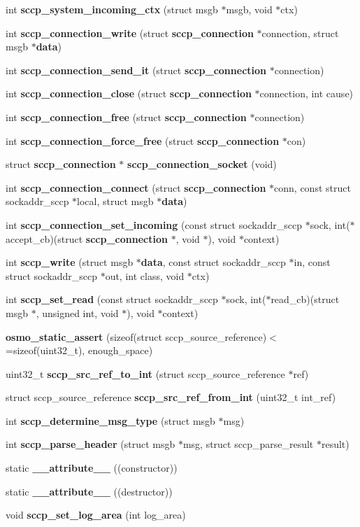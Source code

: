 \begin{DoxyCompactItemize}
int {\bf sccp\+\_\+system\+\_\+incoming\+\_\+ctx} (struct msgb $\ast$msgb, void $\ast$ctx)
\item 
int {\bf sccp\+\_\+connection\+\_\+write} (struct {\bf sccp\+\_\+connection} $\ast$connection, struct msgb $\ast${\bf data})
\item 
int {\bf sccp\+\_\+connection\+\_\+send\+\_\+it} (struct {\bf sccp\+\_\+connection} $\ast$connection)
\item 
int {\bf sccp\+\_\+connection\+\_\+close} (struct {\bf sccp\+\_\+connection} $\ast$connection, int cause)
\item 
int {\bf sccp\+\_\+connection\+\_\+free} (struct {\bf sccp\+\_\+connection} $\ast$connection)
\item 
int {\bf sccp\+\_\+connection\+\_\+force\+\_\+free} (struct {\bf sccp\+\_\+connection} $\ast$con)
\item 
struct {\bf sccp\+\_\+connection} $\ast$ {\bf sccp\+\_\+connection\+\_\+socket} (void)
\item 
int {\bf sccp\+\_\+connection\+\_\+connect} (struct {\bf sccp\+\_\+connection} $\ast$conn, const struct sockaddr\+\_\+sccp $\ast$local, struct msgb $\ast${\bf data})
\item 
int {\bf sccp\+\_\+connection\+\_\+set\+\_\+incoming} (const struct sockaddr\+\_\+sccp $\ast$sock, int($\ast$accept\+\_\+cb)(struct {\bf sccp\+\_\+connection} $\ast$, void $\ast$), void $\ast$context)
\item 
int {\bf sccp\+\_\+write} (struct msgb $\ast${\bf data}, const struct sockaddr\+\_\+sccp $\ast$in, const struct sockaddr\+\_\+sccp $\ast$out, int class, void $\ast$ctx)
\item 
int {\bf sccp\+\_\+set\+\_\+read} (const struct sockaddr\+\_\+sccp $\ast$sock, int($\ast$read\+\_\+cb)(struct msgb $\ast$, unsigned int, void $\ast$), void $\ast$context)
\item 
{\bf osmo\+\_\+static\+\_\+assert} (sizeof(struct sccp\+\_\+source\+\_\+reference)$<$=sizeof(uint32\+\_\+t), enough\+\_\+space)
\item 
uint32\+\_\+t {\bf sccp\+\_\+src\+\_\+ref\+\_\+to\+\_\+int} (struct sccp\+\_\+source\+\_\+reference $\ast$ref)
\item 
struct sccp\+\_\+source\+\_\+reference {\bf sccp\+\_\+src\+\_\+ref\+\_\+from\+\_\+int} (uint32\+\_\+t int\+\_\+ref)
\item 
int {\bf sccp\+\_\+determine\+\_\+msg\+\_\+type} (struct msgb $\ast$msg)
\item 
int {\bf sccp\+\_\+parse\+\_\+header} (struct msgb $\ast$msg, struct sccp\+\_\+parse\+\_\+result $\ast$result)
\item 
static {\bf \+\_\+\+\_\+attribute\+\_\+\+\_\+} ((constructor))
\item 
static {\bf \+\_\+\+\_\+attribute\+\_\+\+\_\+} ((destructor))
\item 
void {\bf sccp\+\_\+set\+\_\+log\+\_\+area} (int log\+\_\+area)
\end{DoxyCompactItemize}
